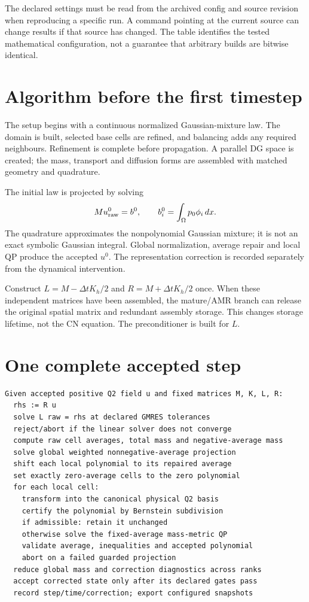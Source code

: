 The declared settings must be read from the archived config and source revision when reproducing a specific run. A command pointing at the current source can change results if that source has changed. The table identifies the tested mathematical configuration, not a guarantee that arbitrary builds are bitwise identical.

\section{Algorithm before the first timestep}
The setup begins with a continuous normalized Gaussian-mixture law. The domain is built, selected base cells are refined, and balancing adds any required neighbours. Refinement is complete before propagation. A parallel DG space is created; the mass, transport and diffusion forms are assembled with matched geometry and quadrature.

The initial law is projected by solving
\begin{equation}
 M u^0_{\rm raw}=b^0,\qquad b_i^0=\int_\Omega p_0\phi_i\,dx.
\end{equation}
The quadrature approximates the nonpolynomial Gaussian mixture; it is not an exact symbolic Gaussian integral. Global normalization, average repair and local QP produce the accepted $u^0$. The representation correction is recorded separately from the dynamical intervention.

Construct $L=M-\Delta tK_h/2$ and $R=M+\Delta tK_h/2$ once. When these independent matrices have been assembled, the mature/AMR branch can release the original spatial matrix and redundant assembly storage. This changes storage lifetime, not the CN equation. The preconditioner is built for $L$.

\section{One complete accepted step}
\begin{lstlisting}[caption={Mathematical pseudocode for the tested two-stage update. Implementation details and abort conditions are part of the specification.}]
Given accepted positive Q2 field u and fixed matrices M, K, L, R:
  rhs := R u
  solve L raw = rhs at declared GMRES tolerances
  reject/abort if the linear solver does not converge
  compute raw cell averages, total mass and negative-average mass
  solve global weighted nonnegative-average projection
  shift each local polynomial to its repaired average
  set exactly zero-average cells to the zero polynomial
  for each local cell:
    transform into the canonical physical Q2 basis
    certify the polynomial by Bernstein subdivision
    if admissible: retain it unchanged
    otherwise solve the fixed-average mass-metric QP
    validate average, inequalities and accepted polynomial
    abort on a failed guarded projection
  reduce global mass and correction diagnostics across ranks
  accept corrected state only after its declared gates pass
  record step/time/correction; export configured snapshots
\end{lstlisting}

